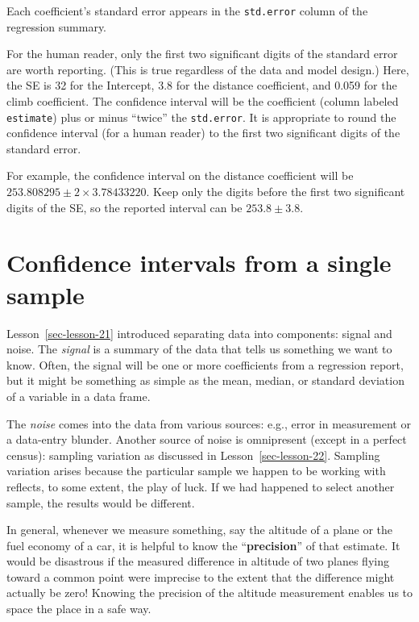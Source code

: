 \documentclass[
  letterpaper,
  DIV=11,
  numbers=noendperiod,
  oneside]{scrreprt}
\begin{document}
\begin{tcolorbox}
Each coefficient's standard error appears in the \texttt{std.error}
column of the regression summary.

For the human reader, only the first two significant digits of the
standard error are worth reporting. (This is true regardless of the data
and model design.) Here, the SE is 32 for the Intercept, 3.8 for the
distance coefficient, and 0.059 for the climb coefficient. The
confidence interval will be the coefficient (column labeled
\texttt{estimate}) plus or minus ``twice'' the \texttt{std.error}. It is
appropriate to round the confidence interval (for a human reader) to the
first two significant digits of the standard error.

For example, the confidence interval on the distance coefficient will be
\(253.808295 \pm 2 \times 3.78433220\). Keep only the digits before the
first two significant digits of the SE, so the reported interval can be
\(253.8 \pm 3.8\).

\end{tcolorbox}

\hypertarget{sec-lesson-23}{%
\chapter{Confidence intervals from a single
sample}\label{sec-lesson-23}}

Lesson~\ref{sec-lesson-21} introduced separating data into components:
signal and noise. The \emph{signal} is a summary of the data that tells
us something we want to know. Often, the signal will be one or more
coefficients from a regression report, but it might be something as
simple as the mean, median, or standard deviation of a variable in a
data frame.

The \emph{noise} comes into the data from various sources: e.g., error
in measurement or a data-entry blunder. Another source of noise is
omnipresent (except in a perfect census): sampling variation as
discussed in Lesson~\ref{sec-lesson-22}. Sampling variation arises
because the particular sample we happen to be working with reflects, to
some extent, the play of luck. If we had happened to select another
sample, the results would be different.

In general, whenever we measure something, say the altitude of a plane
or the fuel economy of a car, it is helpful to know the
``\textbf{precision}'' of that estimate. It would be disastrous if the
measured difference in altitude of two planes flying toward a common
point were imprecise to the extent that the difference might actually be
zero! Knowing the precision of the altitude measurement enables us to
space the place in a safe way.
\end{document}
